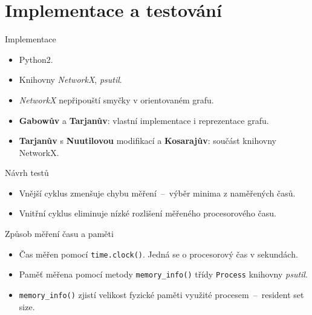 \documentclass{beamer}
\begin{document}
\section{Implementace a testování}
\begin{frame}{Implementace}
\begin{itemize}
\item Python2.
\item Knihovny \emph{NetworkX}, \emph{psutil}.
\item \emph{NetworkX} nepřipouští smyčky v orientovaném grafu.
\bigskip
\item \textbf{Gabowův} a \textbf{Tarjanův}: vlastní implementace i reprezentace grafu.
\item \textbf{Tarjanův} s \textbf{Nuutilovou} modifikací a \textbf{Kosarajův}: součást knihovny NetworkX.
\end{itemize}
\end{frame}

\begin{frame}{Návrh testů}
\begin{algorithm}[H]
\scriptsize
\begin{algorithmic}
    \ENDFOR
  \ENDFOR
\end{algorithmic}
\caption{Metoda měření.}
\label{alg:measurement}
\end{algorithm}

\begin{itemize}
\item Vnější cyklus zmenšuje chybu měření\ --\ výběr minima z naměřených časů.
\item Vnitřní cyklus eliminuje nízké rozlišení měřeného procesorového času.
\end{itemize}
\end{frame}

\begin{frame}{Způsob měření času a paměti}
\begin{itemize}
\item Čas měřen pomocí \texttt{time.clock()}. Jedná se o procesorový čas v sekundách.
\bigskip
\item Paměť měřena pomocí metody \texttt{memory\_info()} třídy \texttt{Process} knihovny \emph{psutil}.
\item \texttt{memory\_info()} zjistí velikost fyzické paměti využité procesem\ --\ resident set size.
\end{itemize}
\end{frame}
\end{document}
